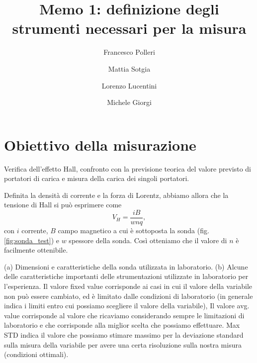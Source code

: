 \documentclass[fleqn,varvw]{memo}
\begin{document}
\title{Memo 1: definizione degli strumenti necessari per la misura}

\author{Francesco Polleri}
\author{Mattia Sotgia}


\author{Lorenzo Lucentini}
\author{Michele Giorgi}

\revised{\today}

\begin{abstract}

\end{abstract}
\maketitle

\section{Obiettivo della misurazione}

Verifica dell'effetto Hall, confronto con la previsione teorica del valore previsto di portatori di carica e misura della carica dei singoli portatori.

Definita la densità di corrente e la forza di Lorentz, abbiamo allora che la tensione di Hall si può esprimere come \begin{equation}
    V_H = \frac{iB}{wnq},
\end{equation} con $i$ corrente, $B$ campo magnetico a cui è sottoposta la sonda (fig. \ref{fig:sonda_test}) e $w$ spessore della sonda. Così otteniamo che il valore di $n$ è facilmente ottenibile. 

\twocolumngrid
\begin{table}
    \subfloat[][]{\label{tab:sonda}}\hspace{5mm}
    \subfloat[][]{\label{tab:min_max_values}}

    \caption{(a) Dimensioni e caratteristiche della sonda utilizzata in laboratorio. (b) Alcune delle caratteristiche importanti delle strumentazioni utilizzate in laboratorio per l'esperienza. Il valore fixed value corrisponde ai casi in cui il valore della variabile non può essere cambiato, ed è limitato dalle condizioni di laboratorio (in generale indica i limiti entro cui possiamo scegliere il valore della variabile), Il valore avg. value corrisponde al valore che ricaviamo considerando sempre le limitazioni di laboratorio e che corrisponde alla miglior scelta che possiamo effettuare. Max STD indica il valore che possiamo stimare massimo per la deviazione standard sulla misura della variabile per avere una certa risoluzione sulla nostra misura (condizioni ottimali).}
\end{table}
\onecolumngrid
\end{document}
